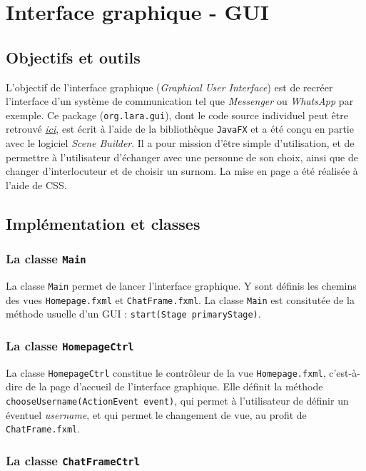 \documentclass[10pt,a4paper]{article}
\begin{document}
\section{Interface graphique - GUI}
\subsection{Objectifs et outils}

L'objectif de l'interface graphique (\textit{Graphical User Interface}) est de recréer l'interface d'un système de communication tel que \textit{Messenger} ou \textit{WhatsApp} par exemple. Ce package (\texttt{org.lara.gui}), dont le code source individuel peut être retrouvé \href{https://github.com/LaraProject/GUI}{\textit{ici}}, est écrit à l'aide de la bibliothèque \texttt{JavaFX} et a été conçu en partie avec le logiciel \textit{Scene Builder}. Il a pour mission d'être simple d'utilisation, et de permettre à l'utilisateur d'échanger avec une personne de son choix, ainsi que de changer d'interlocuteur et de choisir un surnom. La mise en page a été réalisée à l'aide de CSS.

\subsection{Implémentation et classes}
\subsubsection{La classe \texttt{Main}}

La classe \texttt{Main} permet de lancer l'interface graphique. Y sont définis les chemins des vues \texttt{Homepage.fxml} et \texttt{ChatFrame.fxml}. La classe \texttt{Main} est consitutée de la méthode usuelle d'un GUI : \texttt{start(Stage primaryStage)}.

\subsubsection{La classe \texttt{HomepageCtrl}}

La classe \texttt{HomepageCtrl} constitue le contrôleur de la vue \texttt{Homepage.fxml}, c'est-à-dire de la page d'accueil de l'interface graphique. Elle définit la méthode \texttt{chooseUsername(ActionEvent event)}, qui permet à l'utilisateur de définir un éventuel \textit{username}, et qui permet le changement de vue, au profit de \texttt{ChatFrame.fxml}.

\subsubsection{La classe \texttt{ChatFrameCtrl}}
\end{document}
